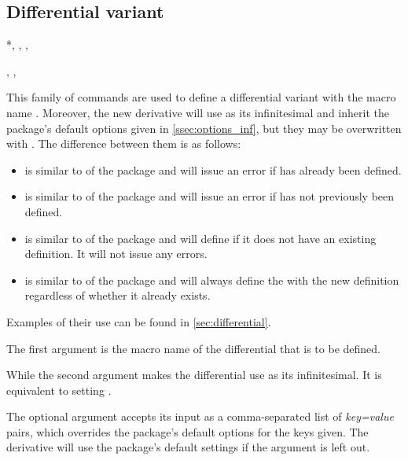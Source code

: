 \subsection{Differential variant} \label{ssec:defvar_inf}

\begin{function}*{\NewDifferential, \RenewDifferential, \ProvideDifferential, \DeclareDifferential}
	\begin{syntax}
		, , 
	\end{syntax}
	This family of commands are used to define a differential variant with the macro name . Moreover, the new derivative will use  as its infinitesimal and inherit the package's default options given in \cref{ssec:options_inf}, but they may be overwritten with . The difference between them is as follows:
	
	\begin{itemize}
		\item {} is similar to  of the  package and will issue an error if  has already been defined.
		\item {} is similar to  of the  package and will issue an error if  has not previously been defined.
		\item {} is similar to  of the  package and will define  if it does not have an existing definition. It will not issue any errors.
		\item {} is similar to  of the  package and will always define the  with the new definition regardless of whether it already exists.
	\end{itemize}
	Examples of their use can be found in \cref{sec:differential}.
	
	\begin{argument}{1}
		The first argument is the macro name of the differential that is to be defined.
	\end{argument}
	
	\begin{argument}{2}
		While the second argument makes the differential  use  as its infinitesimal. It is equivalent to setting .
	\end{argument}
	
	\begin{argument}{3}
		The optional argument accepts its input as a comma-separated list of \emph{key=value} pairs, which overrides the package's default options for the keys given. The derivative  will use the package's default settings if the argument is left out.
	\end{argument}
\end{function}


